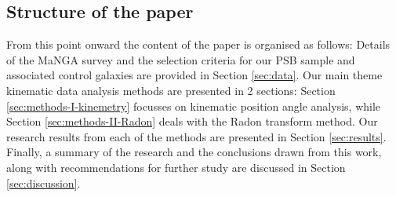 \subsection{Structure of the paper}
From this point onward the content of the paper is organised as follows: Details of the MaNGA survey and the selection criteria for our PSB sample and associated control galaxies are provided in Section \ref{sec:data}. Our main theme kinematic data analysis methods are presented in 2 sections: Section \ref{sec:methods-I-kinemetry} focusses on kinematic position angle analysis, while Section \ref{sec:methods-II-Radon} deals with the Radon transform method. Our research results from each of the methods are presented in Section \ref{sec:results}. Finally, a summary of the research and the conclusions drawn from this work, along with recommendations for further study are discussed in Section \ref{sec:discussion}.
